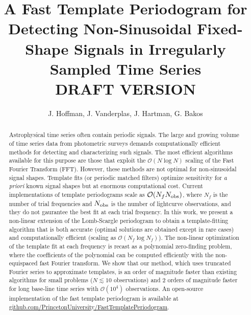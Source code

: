 \documentclass[apj]{emulateapj}
\newcommand{\bigO}{\mathcal{O}}
\begin{document}
\title{A Fast Template Periodogram for Detecting Non-Sinusoidal Fixed-Shape Signals in Irregularly Sampled Time Series\\
         DRAFT VERSION \versioninfo }

\author{J. Hoffman,
J. Vanderplas,
J. Hartman,
G. Bakos}


\begin{abstract}

    Astrophysical time series often contain periodic signals. The large and growing volume of time series data from 
    photometric surveys demands computationally efficient methods for detecting and characterizing such signals. 
    The most efficient algorithms available for this purpose are those that exploit the 
    $\bigO(N\log N)$ scaling of the Fast Fourier Transform (FFT). However, these methods are not optimal 
    for non-sinusoidal signal shapes. Template fits (or periodic matched filters) optimize 
    sensitivity for \emph{a priori} known signal shapes but at enormous computational cost. Current 
    implementations of template periodograms scale as $\bigO(N_f N_{\rm obs})$, where $N_f$ is the number 
    of trial frequencies and $N_{\rm obs}$ is the number of lightcurve observations, and they do not 
    gaurantee the best fit at each trial frequency. In this work, we present a non-linear extension of the Lomb-Scargle 
    periodogram to obtain a template-fitting algorithm that is both accurate (optimal solutions are
    obtained except in rare cases) and computationally efficient (scaling as $\bigO(N_f\log N_f)$). 
    The non-linear optimization of the template fit at each frequency is recast as a polynomial 
    zero-finding problem, where the coefficients of the polynomial can be computed efficiently with
    the non-equispaced fast Fourier transform. We show that our method, which uses truncated Fourier series to approximate templates, 
    is an order of magnitude faster than existing algorithms for small problems ($N\lesssim 10$ observations) and
    2 orders of magnitude faster for long base-line time series with $\bigO(10^4)$ observations.
    An open-source implementation of the fast template periodogram is available at 
    \href{https://www.github.com/PrincetonUniversity/FastTemplatePeriodogram}{github.com/PrincetonUniversity/FastTemplatePeriodogram}. 
\end{abstract}
\end{document}
